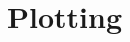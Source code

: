 \documentclass[../fem.tex]{subfile}
\begin{document}
\section{Plotting}%
\label{sec:plotting}
\end{document}
